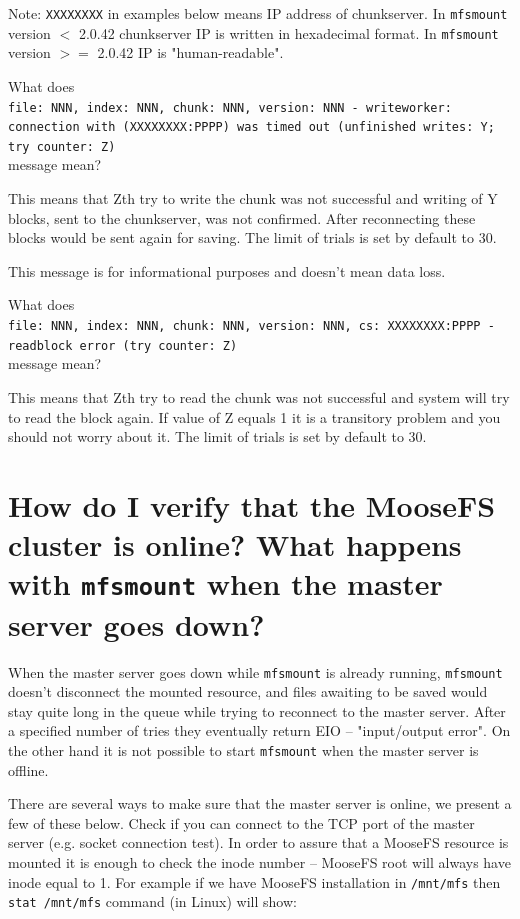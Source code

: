 \documentclass[a4paper,11pt,english]{report}
\def\code#1{\texttt{#1}}
\begin{document}
		Note: \code{XXXXXXXX} in examples below means IP address of chunkserver. In \code{mfsmount} version $<$ 2.0.42 chunkserver IP is written in hexadecimal format. In \code{mfsmount} version $>=$ 2.0.42 IP is "human-readable".
		 
		What does \\
		\code{file: NNN, index: NNN, chunk: NNN, version: NNN - writeworker:
		connection with (XXXXXXXX:PPPP) was timed out (unfinished writes: Y; try counter: Z)} \\
		message mean?
		
		This means that Zth try to write the chunk was not successful and writing of Y blocks, sent to the chunkserver, was not confirmed. After reconnecting these blocks would be sent again for saving. The limit of trials is set by default to 30.
		
		This message is for informational purposes and doesn't mean data loss.
		 
		What does \\
		\code{file: NNN, index: NNN, chunk: NNN, version: NNN, cs: XXXXXXXX:PPPP - readblock error (try counter: Z)} \\
		message mean?
		 
		This means that Zth try to read the chunk was not successful and system will try to read the block again. If value of Z equals 1 it is a transitory problem and you should not worry about it. The limit of trials is set by default to 30.
		
		
		\section{How do I verify that the MooseFS cluster is online? What happens with \code{mfsmount} when the master server goes down?}
		When the master server goes down while \code{mfsmount} is already running, \code{mfsmount} doesn't disconnect the mounted resource, and files awaiting to be saved would stay quite long in the queue while trying to reconnect to the master server. After a specified number of tries they eventually return EIO -- "input/output error". On the other hand it is not possible to start \code{mfsmount} when the master server is offline.
		
		There are several ways to make sure that the master server is online, we present a few of these below.
		Check if you can connect to the TCP port of the master server (e.g. socket connection test).
		In order to assure that a MooseFS resource is mounted it is enough to check the inode number -- MooseFS root will always have inode equal to 1. For example if we have MooseFS installation in \code{/mnt/mfs} then \code{stat /mnt/mfs} command (in Linux) will show:
		
\end{document}
